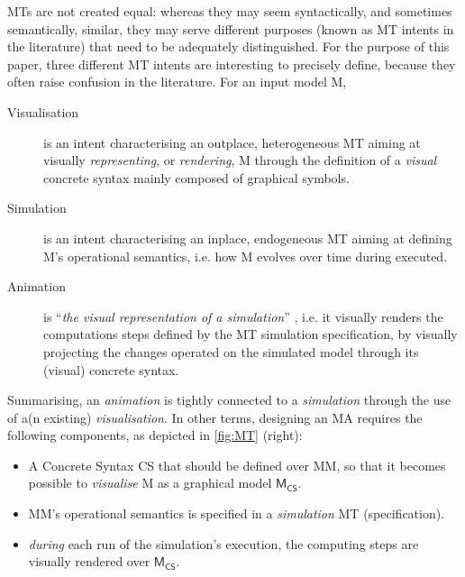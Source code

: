 MTs are not created equal: whereas they may seem syntactically, and sometimes 
semantically, similar, they may serve different purposes (known as MT intents
\citep{J:Lucio-Amrani-etAl:2014} in the literature) that need to be adequately
distinguished. For the purpose of this paper, three different MT intents are
interesting to precisely define, because they often raise confusion in the literature.
For an input model \textsf{M},
\begin{description}
   \item[Visualisation] is an intent characterising an outplace, heterogeneous
   MT aiming at visually \emph{representing}, or \emph{rendering}, \textsf{M} 
   through the definition of a \emph{visual} concrete syntax mainly composed of 
   graphical symbols.
   
   \item[Simulation] is an intent characterising an inplace, endogeneous MT aiming
   at defining \textsf{M}'s operational semantics, i.e. how \textsf{M} evolves 
   over time during executed.
   
   \item[Animation] is ``\emph{the visual representation of a simulation}'' 
   \citep{J:Lucio-Amrani-etAl:2014}, i.e. it visually renders the computations steps
   defined by the MT simulation specification, by visually projecting the changes
   operated on the simulated model through its (visual) concrete syntax.
\end{description}
Summarising, an \emph{animation} is tightly connected to a \emph{simulation} through
the use of a(n existing) \emph{visualisation}.
In other terms, designing an MA requires the following components, as depicted 
in \autoref{fig:MT} (right):
\begin{itemize}
	\item A Concrete Syntax \textsf{CS} that should be defined over \textsf{MM}, so
   that it becomes possible to \emph{visualise} \textsf{M} as a graphical model 
   $\mathsf{M}_{\mathsf{CS}}$.
   
   \item \textsf{MM}'s operational semantics is specified in a \emph{simulation}
   MT (specification).
   
   \item \emph{during} each run of the simulation's execution, the computing steps
   are visually rendered over $\mathsf{M}_{\mathsf{CS}}$.
\end{itemize}

